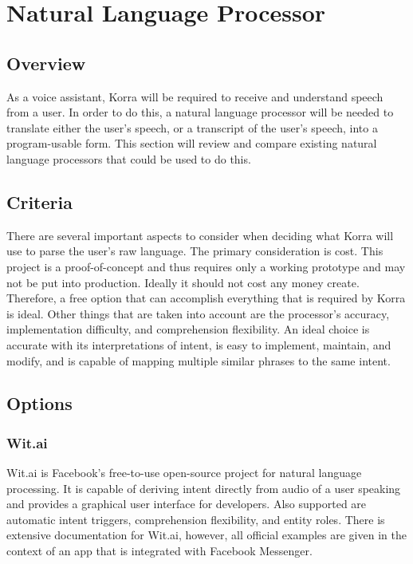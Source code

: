 \documentclass[onecolumn, draftclsnofoot,10pt, compsoc]{IEEEtran}
\def \botname{Korra\xspace}
\begin{document}
\section{Natural Language Processor}
    \subsection{Overview}
        As a voice assistant, \botname will be required to receive and understand speech from a user. 
        In order to do this, a natural language processor will be needed to translate either the user's speech, or a transcript of the user's speech, into a program-usable form. 
        This section will review and compare existing natural language processors that could be used to do this.

    \subsection{Criteria}
        There are several important aspects to consider when deciding what \botname will use to parse the user's raw language. 
        The primary consideration is cost. 
        This project is a proof-of-concept and thus requires only a working prototype and may not be put into production. 
        Ideally it should not cost any money create. 
        Therefore, a free option that can accomplish everything that is required by \botname is ideal. 
        Other things that are taken into account are the processor's accuracy, implementation difficulty, and comprehension flexibility. 
        An ideal choice is accurate with its interpretations of intent, is easy to implement, maintain, and modify, and is capable of mapping multiple similar phrases to the same intent.
        
    \subsection{Options}
        \subsubsection{Wit.ai}
            Wit.ai is Facebook's free-to-use open-source project for natural language processing\cite{WitFAQ}. 
            It is capable of deriving intent directly from audio of a user speaking and provides a graphical user interface for developers. 
            Also supported are automatic intent triggers, comprehension flexibility, and entity roles. 
            There is extensive documentation for Wit.ai, however, all official examples are given in the context of an app that is integrated with Facebook Messenger\cite{NLPComparisons}.
\end{document}

